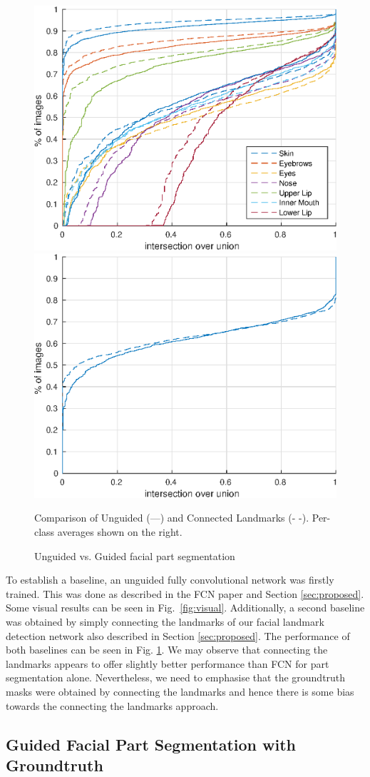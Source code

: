 \begin{figure}
\includegraphics[width=0.5\linewidth]{figs/lan-vs-un.eps}
\includegraphics[width=0.5\linewidth]{figs/lan-vs-un-mean.eps}
\caption{Unguided vs. Guided facial part segmentation}{Comparison of
  Unguided (---) and Connected Landmarks (-{ }-). Per-class averages
  shown on the right.}
\label{fig:lan-vs-un}
\end{figure}

To establish a baseline, an unguided fully convolutional network was
firstly trained. This was done as described in the FCN paper
\cite{long2015fully} and Section \ref{sec:proposed}. Some visual
results can be seen in Fig.~\ref{fig:visual}. Additionally, a second
baseline was obtained by simply connecting the landmarks of our facial
landmark detection network also described in Section
\ref{sec:proposed}. The performance of both baselines can be seen in
Fig. \ref{fig:lan-vs-un}. We may observe that connecting the landmarks
appears to offer slightly better performance than FCN for part
segmentation alone. Nevertheless, we need to emphasise that the
groundtruth masks were obtained by connecting the landmarks and hence
there is some bias towards the connecting the landmarks approach.

\subsection{Guided Facial Part Segmentation with Groundtruth}

